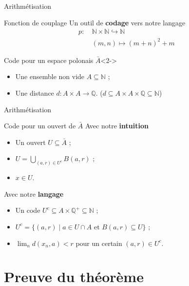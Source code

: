 \documentclass{beamer} %
\newcommand{\N}{\mathbb{N}}
\newcommand{\Q}{\mathbb{Q}}
\begin{document}
\begin{frame}{Arithmétisation}
    \begin{block}{Fonction de couplage}
    Un outil de \textbf{codage} vers notre langage
        \begin{align*}
            p : \ &\N \times \N \hookrightarrow \N \\
            &(m,n) \mapsto (m+n)^2 + m
        \end{align*}
    \end{block}
    \begin{block}{Code pour un espace polonais $\bar{A}$}<2->
        \begin{itemize}
            \item Une ensemble non vide $A \subseteq \N$ ;
            \item Une distance $d : A \times A \to \Q$. ($d \subseteq A \times A \times \Q \subseteq \N$)
        \end{itemize}
    \end{block}
\end{frame}

\begin{frame}{Arithmétisation}
    \begin{block}{Code pour un ouvert de $\bar{A}$}
    Avec notre \textbf{intuition}
        \begin{itemize}
            \item<1-> Un ouvert $U \subseteq \bar{A}$ ;
            \item<2-> $U = \bigcup_{(a,r) \in U^c} B(a,r)$ ;
            \item<3-> $x \in U$.
        \end{itemize}
    Avec notre \textbf{langage} 
        \begin{itemize}
            \item<1-> Un code $U^c \subseteq A \times \Q^+ \subseteq \N$ ;
            \item<2-> $U^c = \{(a,r) \mid a \in U \cap A \text{ et } B(a,r) \subseteq U\}$ ;
            \item<3-> $\lim_n d(x_n,a) < r$ pour un certain $(a,r) \in U^c$.
        \end{itemize}
    \end{block}
    
\end{frame}


\section{Preuve du théorème}
\end{document}
